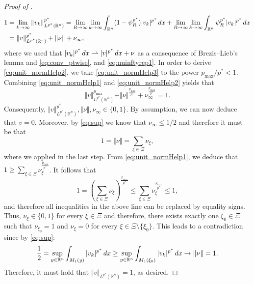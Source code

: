 \documentclass[11pt]{amsart}
\theoremstyle{plain}
\theoremstyle{definition}
\numberwithin{equation}{section}
\renewcommand{\d}{\textnormal{d}}
\newcommand{\R}{\mathbb{R}}
\begin{document}
\begin{proof} [Proof of ]
\begin{equation}
\begin{split}
1 &= \lim_{k \to \infty} \Vert v_k \Vert_{L^{p^{\ast}}(\R^n)}^{p^{\ast}} = \lim_{R \to \infty} \lim_{k \to \infty} \int_{\R^n} (1-\psi_R^{p^{\ast}}) \vert v_k \vert^{p^{\ast}} \, \d x + \lim_{R \to \infty} \lim_{k \to \infty} \int_{\R^n} \psi_R^{p^{\ast}} \vert v_k \vert^{p^{\ast}} \, \d x\\
&=\Vert v \Vert_{L^{p^{\ast}}(\R^n)}^{p^{\ast}} + \Vert \nu \Vert+ \nu_{\infty},
\end{split}
\end{equation}
where we used that $\vert v_k \vert^{p^{\ast}}\, \d x \rightharpoonup \vert v \vert^{p^{\ast}} \, \d x + \nu$ as a consequence of Brezis–Lieb's lemma and \eqref{eq:conv_ptwise}, and \eqref{eq:nuinftyrep1}. In order to derive \eqref{eq:unit_normHelp2}, we take \eqref{eq:unit_normHelp3} to the power $p_{\max}/p^{\ast} < 1$.
Combining \eqref{eq:unit_normHelp1} and \eqref{eq:unit_normHelp2} yields that
\begin{equation*}
\Vert v \Vert_{L^{p^{\ast}}(\R^n)}^{p_{\max}} + \Vert \nu \Vert^{\frac{p_{\max}}{p^{\ast}}} + \nu_{\infty}^{\frac{p_{\max}}{p^{\ast}}} = 1.
\end{equation*}
Consequently, $\Vert v \Vert_{L^{p^{\ast}}(\R^n)}^{p^{\ast}}, \Vert \nu \Vert, \nu_{\infty} \in \{0,1\}$. By assumption, we can now deduce that $v = 0$. Moreover, by \eqref{eq:sup} we know that $\nu_{\infty} \le 1/2$ and therefore it must be that 
\begin{equation*}
1 = \Vert \nu \Vert = \sum_{\xi \in \Xi} \nu_{\xi},
\end{equation*}
where we applied  in the last step.
From \eqref{eq:unit_normHelp1}, we deduce that $1 \ge  \sum_{\xi\in\Xi} \nu_{\xi}^{\frac{p_{\max}}{p^{\ast}}}$. It follows that
\begin{equation*}
1 = \left( \sum_{\xi \in \Xi} \nu_{\xi} \right)^{\frac{p_{\max}}{p^{\ast}}} \le \sum_{\xi \in \Xi} \nu_{\xi}^{\frac{p_{\max}}{p^{\ast}}} \le 1,
\end{equation*}
and therefore all inequalities in the above line can be replaced by equality signs. Thus, $\nu_{\xi} \in \{0,1\}$ for every $\xi \in \Xi$ and therefore, there exists exactly one $\xi_0 \in \Xi$ such that $\nu_{\xi_0} = 1$ and $\nu_{\xi} = 0$ for every $\xi \in \Xi \setminus \{\xi_0\}$. This leads to a contradiction since by \eqref{eq:sup}:
\begin{equation*}
\frac{1}{2} = \sup_{y \in \R^n} \int_{M_1(y)} \vert v_k \vert^{p^{\ast}} \, \d x \ge \sup_{y \in \R^n} \int_{M_1(\xi_0)} \vert v_k \vert^{p^{\ast}} \, \d x \to \Vert \nu \Vert = 1.
\end{equation*}
Therefore, it must hold that $\Vert v \Vert_{L^{p^{\ast}}(\R^n)} = 1$, as desired.
\end{proof}
\end{document}
